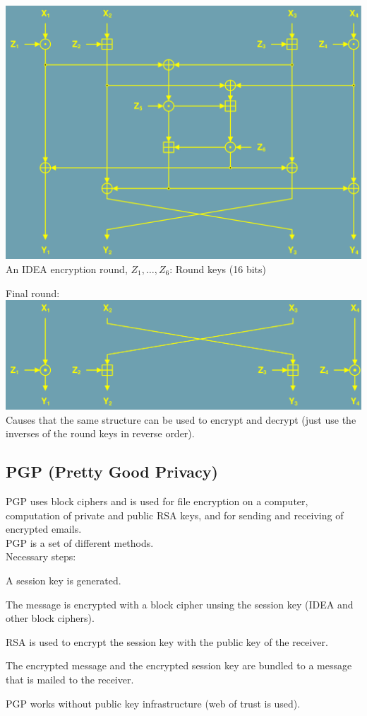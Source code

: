 \begin{multicols}{2}
\vfill\null
\columnbreak
\begin{minipage}{\linewidth}
\includegraphics[width=0.8\linewidth]{./bilder/IDEA_structure.png}\\
An IDEA encryption round, $Z_1, \ldots, Z_6$: Round keys (16 bits)\\
\end{minipage}

Final round:\\
\includegraphics[width=\linewidth]{./bilder/IDEA_final_round.png}
Causes that the same structure can be used to encrypt and decrypt (just use the inverses of the round keys in reverse order).
\end{multicols}

\subsection{PGP (Pretty Good Privacy)}
PGP uses block ciphers and is used for file encryption on a computer, computation of private and public RSA keys, and for sending and receiving of encrypted emails.\\
PGP is a set of different methods.\\
Necessary steps:
\begin{aufzaehlung}
\item A session key is generated.
\item The message is encrypted with a block cipher unsing the session key (IDEA and other block ciphers).
\item RSA is used to encrypt the session key with the public key of the receiver.
\item The encrypted message and the encrypted session key are bundled to a message that is mailed to the receiver.\\
\end{aufzaehlung}
PGP works without public key infrastructure (web of trust is used).

